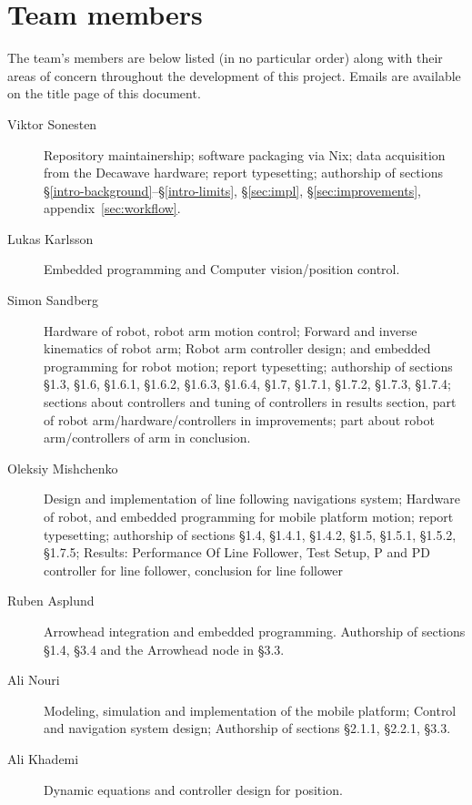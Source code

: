 \section{Team members}
The team's members are below listed (in no particular order) along with their areas of concern throughout the development of this project.
Emails are available on the title page of this document.

\begin{description}
\item[Viktor Sonesten] Repository maintainership; software packaging
  via Nix; data acquisition from the Decawave hardware; report
  typesetting; authorship of sections §\ref{intro-background}--§\ref{intro-limits}, §\ref{sec:impl}, §\ref{sec:improvements}, appendix~\ref{sec:workflow}.

    \item[Lukas Karlsson]
    Embedded programming and
    Computer vision/position control.

    \item[Simon Sandberg]
    Hardware of robot, robot arm motion control;
    Forward and inverse kinematics of robot arm;
    Robot arm controller design;
    and embedded programming for robot motion; report
    typesetting; authorship of sections §1.3, §1.6, §1.6.1, §1.6.2, §1.6.3, §1.6.4, §1.7, §1.7.1, §1.7.2, §1.7.3, §1.7.4;
    sections about controllers and tuning of controllers in results section, part of robot arm/hardware/controllers in improvements;
    part about robot arm/controllers of arm in conclusion.

    \item[Oleksiy Mishchenko]
    Design and implementation of line following navigations system;
    Hardware of robot, and embedded programming for mobile platform motion; report
     typesetting; authorship of sections §1.4, §1.4.1, §1.4.2, §1.5, §1.5.1, §1.5.2, §1.7.5;
     Results: Performance Of Line Follower, Test Setup, P and PD controller for line follower, conclusion for line follower

    \item[Ruben Asplund]
    Arrowhead integration and embedded programming.
    Authorship of sections §1.4, §3.4 and the Arrowhead node in §3.3.

    \item[Ali Nouri]
    Modeling, simulation and implementation of the mobile platform;
    Control and navigation system design;
    Authorship of sections §2.1.1, §2.2.1, §3.3.

    \item[Ali Khademi]
    Dynamic equations and controller design for position.
\end{description}
